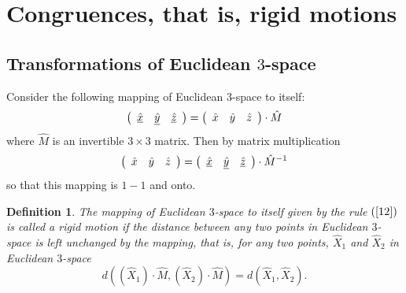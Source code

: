\documentclass{article}%
\newtheorem{definition}[theorem]{Definition}
\begin{document}
\section{Congruences, that is, rigid motions}

\subsection{Transformations of Euclidean $3$-space}

Consider the following mapping of Euclidean $3$-space to itself:%
\begin{equation}
\left(
\begin{array}
[c]{ccc}%
\underline{\hat{x}} & \underline{\hat{y}} & \underline{\hat{z}}%
\end{array}
\right)  =\left(
\begin{array}
[c]{ccc}%
\hat{x} & \hat{y} & \hat{z}%
\end{array}
\right)  \cdot\hat{M} \label{12}%
\end{equation}
where $\hat{M}$ is an invertible $3\times3$ matrix. Then by matrix
multiplication%
\[
\left(
\begin{array}
[c]{ccc}%
\hat{x} & \hat{y} & \hat{z}%
\end{array}
\right)  =\left(
\begin{array}
[c]{ccc}%
\underline{\hat{x}} & \underline{\hat{y}} & \underline{\hat{z}}%
\end{array}
\right)  \cdot\hat{M}^{-1}%
\]
so that this mapping is $1-1$ and onto.

\begin{definition}
The mapping of Euclidean $3$-space to itself given by the rule $\left(
\ref{12}\right)  $ is called a rigid motion if the distance between any two
points in Euclidean $3$-space is left unchanged by the mapping, that is, for
any two points, $\hat{X}_{1}$ and $\hat{X}_{2}$ in Euclidean $3$-space%
\[
d\left(  \left(  \hat{X}_{1}\right)  \cdot\hat{M},\left(  \hat{X}_{2}\right)
\cdot\hat{M}\right)  =d\left(  \hat{X}_{1},\hat{X}_{2}\right)  .
\]

\end{definition}
\end{document}
